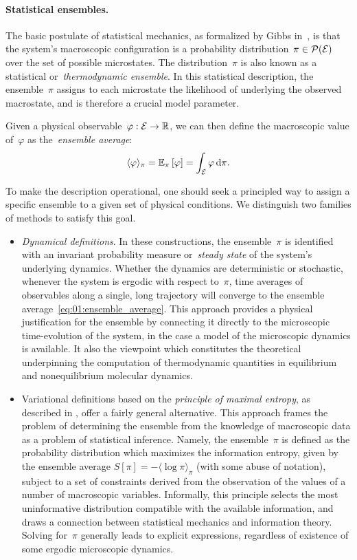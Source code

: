 \paragraph{Statistical ensembles.}
The basic postulate of statistical mechanics, as formalized by Gibbs in~\cite{G02}, is that the system's macroscopic configuration is a probability distribution~${\pi\in\mathcal{P}(\mathcal{E})}$ over the set of possible microstates.
The distribution~$\pi$ is also known as a statistical or~\textit{thermodynamic ensemble}. In this statistical description, the ensemble~$\pi$ assigns to each microstate the likelihood of underlying the observed macrostate, and is therefore a crucial model parameter.

Given a physical observable~$\varphi:\mathcal{E}\to\mathbb{R}$, we can then define the macroscopic value of~$\varphi$ as the~\textit{ensemble average}:
\begin{equation}
    \label{eq:01:ensemble_average}
    \langle \varphi\rangle_{\pi} = \mathbb{E}_\pi\left[\varphi\right]= \int_{\mathcal{E}}\varphi\,\mathrm{d} \pi.
\end{equation}

To make the description operational, one should seek a principled way to assign a specific ensemble to a given set of physical conditions.
We distinguish two families of methods to satisfy this goal.

\begin{itemize}
    \item{\textit{Dynamical definitions}. In these constructions, the ensemble~$\pi$ is identified with an invariant probability measure or~\textit{steady state} of the system's underlying dynamics.
    Whether the dynamics are deterministic or stochastic, whenever the system is ergodic with respect to~$\pi$, time averages of observables along a single, long trajectory will converge to the ensemble average~\eqref{eq:01:ensemble_average}.
    This approach provides a physical justification for the ensemble by connecting it directly to the microscopic time-evolution of the system, in the case a model of the microscopic dynamics is available.
    It also the viewpoint which constitutes the theoretical underpinning the computation of thermodynamic quantities in equilibrium and nonequilibrium molecular dynamics.
    }
    \item{Variational definitions based on the \textit{principle of maximal entropy}, as described in \cite{J57a,J57b}, offer a fairly general alternative.
    This approach frames the problem of determining the ensemble from the knowledge of macroscopic data as a problem of statistical inference.
    Namely, the ensemble~$\pi$ is defined as the probability distribution which maximizes the information entropy, given by the ensemble average $S[\pi] = -\langle\log\pi\rangle_\pi$ (with some abuse of notation), subject to a set of constraints derived from the observation of the values of a number of macroscopic variables.
    Informally, this principle selects the most uninformative distribution compatible with the available information, and draws a connection between statistical mechanics and information theory. Solving for~$\pi$ generally leads to explicit expressions, regardless of existence of some ergodic microscopic dynamics.}
\end{itemize}

